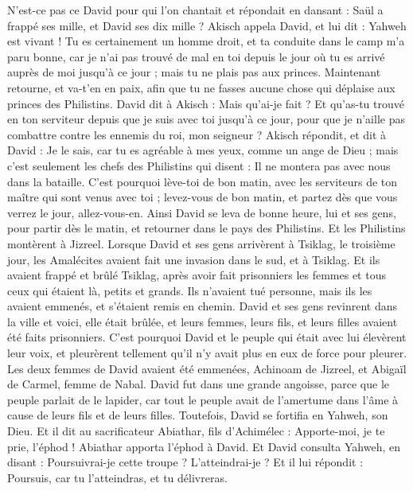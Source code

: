 \begin{multicols}{2}
N'est-ce pas ce David pour qui l'on chantait et répondait en dansant : Saül a frappé ses mille, et David ses dix mille ?
Akisch appela David, et lui dit : Yahweh est vivant ! Tu es certainement un homme droit, et ta conduite dans le camp m'a paru bonne, car je n'ai pas trouvé de mal en toi depuis le jour où tu es arrivé auprès de moi jusqu'à ce jour ; mais tu ne plais pas aux princes.
Maintenant retourne, et va-t'en en paix, afin que tu ne fasses aucune chose qui déplaise aux princes des Philistins.
David dit à Akisch : Mais qu'ai-je fait ? Et qu'as-tu trouvé en ton serviteur depuis que je suis avec toi jusqu'à ce jour, pour que je n'aille pas combattre contre les ennemis du roi, mon seigneur ?
Akisch répondit, et dit à David : Je le sais, car tu es agréable à mes yeux, comme un ange de Dieu ; mais c'est seulement les chefs des Philistins qui disent : Il ne montera pas avec nous dans la bataille.
C'est pourquoi lève-toi de bon matin, avec les serviteurs de ton maître qui sont venus avec toi ; levez-vous de bon matin, et partez dès que vous verrez le jour, allez-vous-en.
Ainsi David se leva de bonne heure, lui et ses gens, pour partir dès le matin, et retourner dans le pays des Philistins. Et les Philistins montèrent à Jizreel.
\VerseOne{}Lorsque David et ses gens arrivèrent à Tsiklag, le troisième jour, les Amalécites avaient fait une invasion dans le sud, et à Tsiklag. Et ils avaient frappé et brûlé Tsiklag,
après avoir fait prisonniers les femmes et tous ceux qui étaient là, petits et grands. Ils n'avaient tué personne, mais ils les avaient emmenés, et s'étaient remis en chemin.
David et ses gens revinrent dans la ville et voici, elle était brûlée, et leurs femmes, leurs fils, et leurs filles avaient été faits prisonniers.
C'est pourquoi David et le peuple qui était avec lui élevèrent leur voix, et pleurèrent tellement qu'il n'y avait plus en eux de force pour pleurer.
Les deux femmes de David avaient été emmenées, Achinoam de Jizreel, et Abigaïl de Carmel, femme de Nabal.
David fut dans une grande angoisse, parce que le peuple parlait de le lapider, car tout le peuple avait de l'amertume dans l'âme à cause de leurs fils et de leurs filles. Toutefois, David se fortifia en Yahweh, son Dieu.
Et il dit au sacrificateur Abiathar, fils d'Achimélec : Apporte-moi, je te prie, l'éphod ! Abiathar apporta l'éphod à David.
Et David consulta Yahweh, en disant : Poursuivrai-je cette troupe ? L'atteindrai-je ? Et il lui répondit : Poursuis, car tu l'atteindras, et tu délivreras.

\end{multicols}
